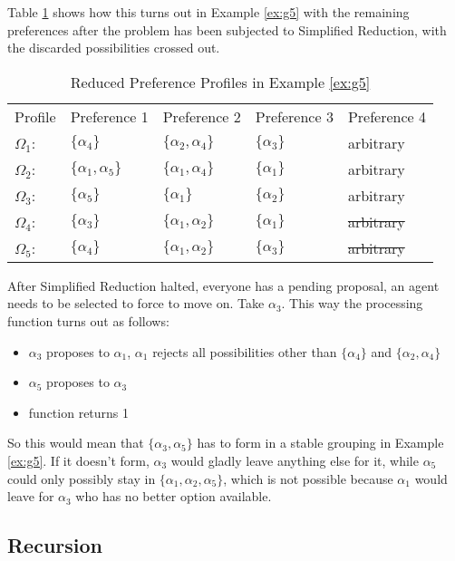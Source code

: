 \documentclass{elsarticle}
\begin{document}
Table \ref{tab:g5red} shows how this turns out in Example \ref{ex:g5} with the remaining preferences after the problem has been subjected to Simplified Reduction, with the discarded possibilities crossed out.


\begin{table}[h]
\centering
\caption{Reduced Preference Profiles in Example \ref{ex:g5}}
\label{tab:g5red}
\begin{tabular}{lllll}
Profile     & Preference 1              & Preference 2              & Preference 3   & Preference 4 \\
$\Omega_1$: & $\{\alpha_4\}$            & $\{\alpha_2 , \alpha_4\}$ & $\{\alpha_3\}$ & arbitrary    \\
$\Omega_2$: & $\{\alpha_1 , \alpha_5\}$ & $\{\alpha_1 , \alpha_4\}$ & $\{\alpha_1\}$ & arbitrary    \\
$\Omega_3$: & $\{\alpha_5\}$            & $\{\alpha_1\}$            & $\{\alpha_2\}$ & arbitrary    \\
$\Omega_4$: & $\{\alpha_3\}$            & $\{\alpha_1 , \alpha_2\}$ & $\{\alpha_1\}$ & \sout{arbitrary}    \\
$\Omega_5$: & \sout{$\{\alpha_4\}$}            & $\{\alpha_1 , \alpha_2\}$ & $\{\alpha_3\}$ & \sout{arbitrary}   
\end{tabular}
\end{table}

After Simplified Reduction halted, everyone has a pending proposal, an agent needs to be selected to force to move on. Take $\alpha_3$. This way the processing function turns out as follows:

\begin{itemize}
\item $\alpha_3$ proposes to $\alpha_1$, $\alpha_1$ rejects all possibilities other than $\{\alpha_4\}$ and $\{\alpha_2 , \alpha_4\}$
\item $\alpha_5$ proposes to $\alpha_3$
\item function returns 1
\end{itemize}

So this would mean that $\{\alpha_3 , \alpha_5\}$ has to form in a stable grouping in Example \ref{ex:g5}. If it doesn't form, $\alpha_3$ would gladly leave anything else for it, while $\alpha_5$ could only possibly stay in $\{\alpha_1 , \alpha_2, \alpha_5\}$, which is not possible because $\alpha_1$ would leave for $\alpha_3$ who has no better option available.

\subsection{Recursion}
\end{document}
